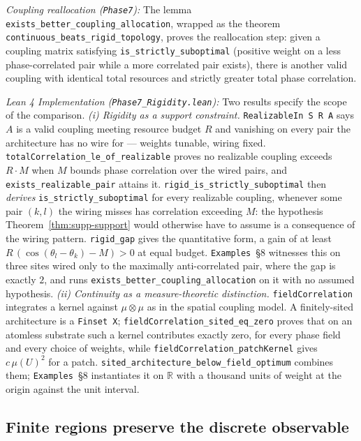 \documentclass{article}
\begin{document}
\textit{Coupling reallocation (\texttt{Phase7}):} The lemma \nolinkurl{exists_better_coupling_allocation}, wrapped as the theorem \nolinkurl{continuous_beats_rigid_topology}, proves the reallocation step: given a coupling matrix satisfying \nolinkurl{is_strictly_suboptimal} (positive weight on a less phase-correlated pair while a more correlated pair exists), there is another valid coupling with identical total resources and strictly greater total phase correlation.

\textit{Lean 4 Implementation (\nolinkurl{Phase7_Rigidity.lean}):} Two results specify the scope of the comparison. \emph{(i) Rigidity as a support constraint.} \texttt{RealizableIn S R A} says $A$ is a valid coupling meeting resource budget $R$ and vanishing on every pair the architecture has no wire for --- weights tunable, wiring fixed. \nolinkurl{totalCorrelation_le_of_realizable} proves no realizable coupling exceeds $R\cdot M$ when $M$ bounds phase correlation over the wired pairs, and \nolinkurl{exists_realizable_pair} attains it. \nolinkurl{rigid_is_strictly_suboptimal} then \emph{derives} \nolinkurl{is_strictly_suboptimal} for every realizable coupling, whenever some pair $(k,l)$ the wiring misses has correlation exceeding $M$: the hypothesis Theorem~\ref{thm:supp-support} would otherwise have to assume is a consequence of the wiring pattern. \nolinkurl{rigid_gap} gives the quantitative form, a gain of at least $R\,(\cos(\theta_l-\theta_k) - M) > 0$ at equal budget. \texttt{Examples}~\S8 witnesses this on three sites wired only to the maximally anti-correlated pair, where the gap is exactly $2$, and runs \nolinkurl{exists_better_coupling_allocation} on it with no assumed hypothesis. \emph{(ii) Continuity as a measure-theoretic distinction.} \texttt{fieldCorrelation} integrates a kernel against $\mu\otimes\mu$ as in the spatial coupling model. A finitely-sited architecture is a \texttt{Finset X}; \nolinkurl{fieldCorrelation_sited_eq_zero} proves that on an atomless substrate such a kernel contributes exactly zero, for every phase field and every choice of weights, while \nolinkurl{fieldCorrelation_patchKernel} gives $c\,\mu(U)^2$ for a patch. \nolinkurl{sited_architecture_below_field_optimum} combines them; \texttt{Examples}~\S8 instantiates it on $\mathbb{R}$ with a thousand units of weight at the origin against the unit interval.

\subsection{Finite regions preserve the discrete observable}
\label{sec:supp-finite-region}
\end{document}
